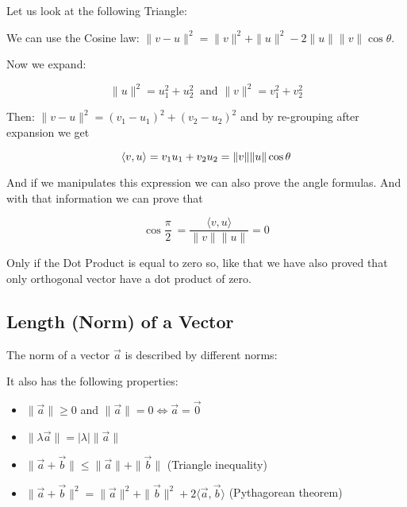 Let us look at the following Triangle:
\begin{center}
\end{center}

We can use the Cosine law: \(\|v - u\|^{2} = \|v\|^2 + \|u\|^2  - 2 \|u\| \|v\| \cos\theta\).
\vspace{\baselineskip}

Now we expand:

\[
\|u\|^2 = u_{1}^2 + u_{2}^2\ \text{ and } \|v\|^2 = v_{1}^2 + v_{2}^2
\]

Then: \(\|v - u\|^2 = {(v_1 - u_1)}^2 + {(v_2 - u_2)}^2\) and by re-grouping after expansion we get

\[\langle v, u\rangle = v_1u_1 + v_2u_2 = \|v\|\|u\|\cos \theta \\ 
\]

\QED

And if we manipulates this expression we can also prove the angle formulas.
And with that information we can prove that

\[\cos \frac{\pi}{2}\ = \frac{\langle v, u\rangle}{\|v\|\|u\|} = 0\]

Only if the Dot Product is equal to zero so, like that we have also proved that
only orthogonal vector have a dot product of zero.

\subsection{Length (Norm) of a Vector}
The norm of a vector \(\vec{a}\) is described by different norms:

It also has the following properties:

\begin{itemize}[label=\(-\)]
	\item \(\|\vec{a}\| \geq 0\) and \(\|\vec{a}\| = 0 \Leftrightarrow \vec{a} = \vec{0}\)
	\item \(\|\lambda \vec{a}\| = |\lambda| \|\vec{a}\|\)
	\item \(\|\vec{a} + \vec{b}\| \leq \|\vec{a}\| + \|\vec{b}\|\) (Triangle inequality)
	\item \(\|\vec{a} + \vec{b}\|^2 = \|\vec{a}\|^2 + \|\vec{b}\|^2 + 2\langle\vec{a}, \vec{b}\rangle\) (Pythagorean theorem)
\end{itemize}

